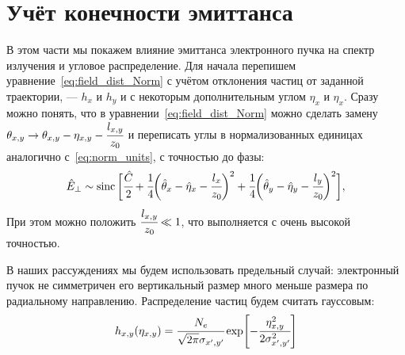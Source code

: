 \iffalse
\chapter{Учёт конечности эмиттанса}
В этом части мы покажем влияние эмиттанса электронного пучка на спектр излучения и угловое распределение. Для начала перепишем уравнение~\ref{eq:field_dist_Norm} с учётом отклонения частиц от заданной траектории, --- $h_x$ и $h_y$ и с некоторым дополнительным углом $\eta_x$ и $\eta_x$. Сразу можно понять, что в уравнении~\ref{eq:field_dist_Norm} можно сделать замену $\theta_{x,y} \rightarrow \theta_{x,y} - \eta_{x, y} - \cfrac{l_{x,y}}{z_0}$ и переписать углы в нормализованных единицах аналогично с~\ref{eq:norm_units}, с точностью до фазы: 
\begin{equation}
\label{eq:field_dist_Norm}
\begin{array}{lcl}
\hat{E}_{\bot} \sim
\operatorname{sinc}\bigg[\cfrac{\hat{C}}{2} + 
\cfrac{1}{4}\bigg(\hat{\theta}_{x} - \hat{\eta}_{x} - \cfrac{l_{x}}{z_0}\bigg)^2 +
\cfrac{1}{4}\bigg(\hat{\theta}_{y} - \hat{\eta}_{y} - \cfrac{l_{y}}{z_0}\bigg)^2\bigg],
\end{array}	
\end{equation}
При этом можно положить  $\cfrac{l_{x,y}}{z_0} \ll 1$, что выполняется с очень высокой точностью. 

В наших рассуждениях мы будем использовать предельный случай: электронный пучок не симметричен его вертикальный размер много меньше размера по радиальному направлению. Распределение частиц будем считать гауссовым: 
\begin{equation}
\label{eq:field_dist_Norm}
h_{x, y}(\eta_{x, y}) = \cfrac{N_e}{\sqrt{2\pi}\sigma_{x', y'}} \exp[-\cfrac{\eta^2_{x, y}}{2\sigma^2_{x', y'}}]
\end{equation}

